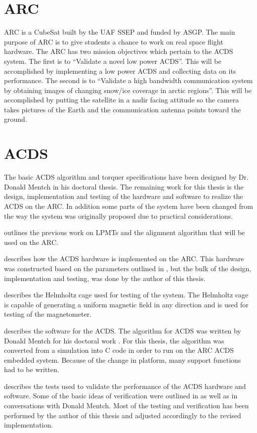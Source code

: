 \section{\acl*{ARC}}

\ac{ARC} is a CubeSat built by the UAF \ac{SSEP} and funded by \ac{ASGP}. The main purpose of \ac{ARC} is to give students a chance to work on real space flight hardware. The \ac{ARC} has two mission objectives which pertain to the \ac{ACDS} system. The first is to \enquote{Validate a novel low power \ac{ACDS}}\cite{ARCweb}. This will be accomplished by implementing a low power \ac{ACDS} and collecting data on its performance. The second is to \enquote{Validate a high bandwidth communication system by obtaining images of changing snow/ice coverage in arctic regions}\cite{ARCweb}. This will be accomplished by putting the satellite in a nadir facing attitude so the camera takes pictures of the Earth and the communication antenna points toward the ground.

\section{\acl*{ACDS}}

The basic \ac{ACDS} algorithm and torquer specifications have been designed by Dr. Donald Mentch in his doctoral thesis\cite{Mentch11}. The remaining work for this thesis is the design, implementation and testing of the hardware and software to realize the \ac{ACDS} on the \ac{ARC}. In addition some parts of the system have been changed from the way the system was originally proposed due to practical considerations.

 outlines the previous work on \acp{LPMT} and the alignment algorithm that will be used on the \ac{ARC}.

 describes how the \ac{ACDS} hardware is implemented on the \ac{ARC}. This hardware was constructed based on the parameters outlined in \cite{Mentch11}, but the bulk of the design, implementation and testing, was done by the author of this thesis.

 describes the Helmholtz cage used for testing of the system. The Helmholtz cage is capable of generating a uniform magnetic field in any direction and is used for testing of the magnetometer.

 describes the software for the \ac{ACDS}. The algorithm for \ac{ACDS} was written by Donald Mentch for his doctoral work \cite{Mentch11}. For this thesis, the algorithm was converted from a \matlab simulation into C code in order to run on the \ac{ARC} \ac{ACDS} embedded system. Because of the change in platform, many support functions had to be written.

 describes the tests used to validate the performance of the ACDS hardware and software. Some of the basic ideas of verification were outlined in \cite{Mentch11} as well as in conversations with Donald Mentch. Most of the testing and verification has been performed by the author of this thesis and adjusted accordingly to the revised implementation.

